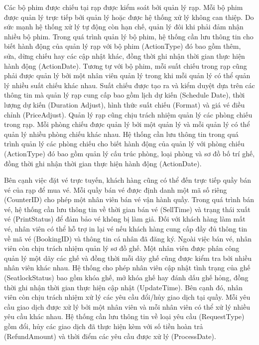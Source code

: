 \documentclass[a4paper]{article}
\begin{document}
Các bộ phim được chiếu tại rạp được kiểm soát bởi quản lý rạp. Mỗi bộ phim được quản lý trực tiếp bởi quản lý hoặc được hệ thống xử lý không can thiệp. Do sức mạnh hệ thống xử lý tự động còn hạn chế, quản lý đôi khi phải đảm nhận nhiều bộ phim. 
Trong quá trình quản lý bộ phim, hệ thống cần lưu thông tin cho biết hành động của quản lý rạp với bộ phim (ActionType) đó bao gồm thêm, sửa, dừng chiếu hay các cập nhật khác, đồng thời ghi nhận thời gian thực hiện hành động (ActionDate).
Tương tự với bộ phim, mỗi suất chiếu trong rạp cũng phải được quản lý bởi một nhân viên quản lý trong khi mỗi quản lý có thể quản lý nhiều suất chiếu khác nhau. 
Suất chiếu được tạo ra và kiểm duyệt dựa trên các thông tin mà quản lý rạp cung cấp bao gồm lịch dự kiến (Schedule Date), thời lượng dự kiến (Duration Adjust), hình thức suất chiếu (Format) và giá vé điều chỉnh (PriceAdjust).
Quản lý rạp cũng chịu trách nhiệm quản lý các phòng chiếu trong rạp. Mỗi phòng chiếu được quản lý bởi một quản lý và mỗi quản lý có thể quản lý nhiều phòng chiếu khác nhau. 
Hệ thống cần lưu thông tin trong quá trình quản lý các phòng chiếu cho biết hành động của quản lý với phòng chiếu (ActionType) đó bao gồm quản lý cấu trúc phòng, loại phòng và sơ đồ bố trí ghế, đồng thời ghi nhận thời gian thực hiện hành động (ActionDate).

Bên cạnh việc đặt vé trực tuyến, khách hàng cũng có thể đến trực tiếp quầy bán vé của rạp để mua vé. Mỗi quầy bán vé được định danh một mã số riêng (CounterID) cho phép một nhân viên bán vé vận hành quầy. 
Trong quá trình bán vé, hệ thống cần lưu thông tin về thời gian bán vé (SellTime) và trạng thái xuất vé (PrintStatus) để đảm bảo vé không bị làm giả. 
Đối với khách hàng làm mất vé, nhân viên có thể hỗ trợ in lại vé nếu khách hàng cung cấp đầy đủ thông tin về mã vé (BookingID) và thông tin cá nhân đã đăng ký.
Ngoài việc bán vé, nhân viên còn chịu trách nhiệm quản lý sơ đồ ghế. Một nhân viên được phân công quản lý một dãy các ghế và đồng thời mỗi dãy ghế cũng được kiểm tra bởi nhiều nhân viên khác nhau. 
Hệ thống cho phép nhân viên cập nhật tình trạng của ghế (SeatlockStatus) bao gồm khóa ghế, mở khóa ghế hay đánh dấu ghế hỏng, đồng thời ghi nhận thời gian thực hiện cập nhật (UpdateTime).
Bên cạnh đó, nhân viên còn chịu trách nhiệm xử lý các yêu cầu đổi/hủy giao dịch tại quầy. Mỗi yêu cầu giao dịch được xử lý bởi một nhân viên và mỗi nhân viên có thể xử lý nhiều yêu cầu khác nhau.
Hệ thống cần lưu thông tin về loại yêu cầu (RequestType) gồm đổi, hủy các giao dịch đã thực hiện kèm với số tiền hoàn trả (RefundAmount) và thời điểm các yêu cầu được xử lý (ProcessDate).
\end{document}

